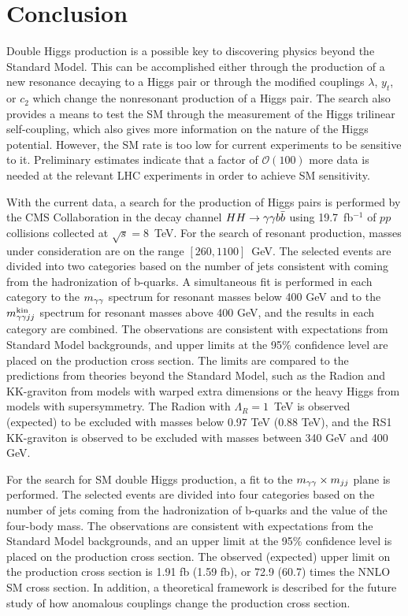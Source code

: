 
\chapter{Conclusion\label{ch:conclusion}}

Double Higgs production is a possible key to discovering physics beyond the Standard Model.
This can be accomplished either through the production of a new resonance decaying to
a Higgs pair or through the modified couplings $\lambda$, $y_t$, or $c_2$
which change the nonresonant production of a Higgs pair. The search also provides a means
to test the SM through the measurement of the Higgs trilinear self-coupling, which also gives
more information on the nature of the Higgs potential. However, the SM rate is too low
for current experiments to be sensitive to it. Preliminary estimates indicate that a factor of
$\mathcal{O}(100)$ more data is needed at the relevant LHC experiments in order to achieve
SM sensitivity.

With the current data, a search for the production of Higgs pairs is performed
by the CMS Collaboration in the decay channel $HH \rightarrow \gamma\gamma b\bar{b}$ using 19.7~fb$^{-1}$
of $pp$ collisions collected at $\sqrt{s} = 8$~TeV.
For the search of resonant production, masses under consideration are on the range 
$[260, 1100]$~GeV. The selected events are divided into two categories based on the number of jets
consistent with coming from the hadronization of b-quarks.
A simultaneous fit is performed in each category to the $m_{\gamma\gamma}$ spectrum for resonant masses
below 400 GeV and to the $m_{\gamma\gamma jj}^{\rm kin}$ spectrum for resonant masses above 400 GeV, and the results
in each category are combined. The observations are consistent with expectations from Standard
Model backgrounds, and upper limits at the 95\% confidence level are placed on the production
cross section. The limits are compared to the predictions from theories beyond the Standard Model,
such as the Radion and KK-graviton from models with warped extra dimensions or the heavy Higgs
from models with supersymmetry. The Radion with $\Lambda_R = 1$~TeV is observed (expected) to be
excluded with masses below 0.97 TeV (0.88 TeV), and the RS1 KK-graviton is observed to be
excluded with masses between 340 GeV and 400 GeV.

For the search for SM double Higgs production, a fit to the $m_{\gamma\gamma} \times m_{jj}$ plane 
is performed. The selected events are divided into four categories based on the number of jets
coming from the hadronization of b-quarks and the value of the four-body mass.
The observations are consistent with expectations from the Standard Model backgrounds, and an
upper limit at the 95\% confidence level is placed on the production cross section.
The observed (expected) upper limit on the production cross section is 1.91 fb (1.59 fb),
or 72.9 (60.7) times the NNLO SM cross section. In addition, a theoretical framework is described
for the future study of how anomalous couplings change the production cross section.
